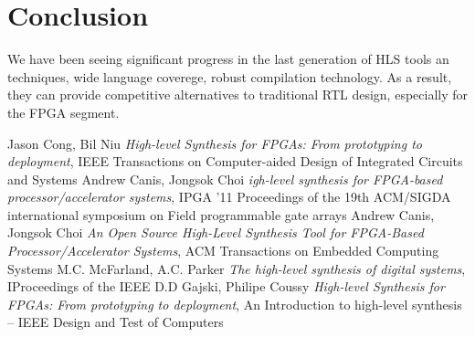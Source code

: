 \documentclass{romjist}
\begin{document}
\section{Conclusion}

\quad We have been seeing significant progress in the last generation of HLS tools an techniques, wide language coverege, robust compilation technology. As a result, they can provide competitive alternatives to traditional RTL design, especially  for the FPGA segment. 



 
\begin{thebibliography}{24}
	Jason Cong, Bil Niu \textit{High-level Synthesis for FPGAs: From prototyping to deployment}, IEEE Transactions on Computer-aided Design of Integrated Circuits and Systems
	Andrew Canis, Jongsok Choi \textit{igh-level synthesis for FPGA-based processor/accelerator systems}, IPGA ’11 Proceedings of the 19th ACM/SIGDA international symposium on Field programmable gate arrays
	Andrew Canis, Jongsok Choi \textit{An Open Source High-Level Synthesis Tool for FPGA-Based Processor/Accelerator Systems}, ACM Transactions on Embedded Computing Systems
 M.C. McFarland, A.C. Parker  \textit{The high-level synthesis of digital systems}, IProceedings of the IEEE
	D.D Gajski, Philipe Coussy \textit{High-level Synthesis for FPGAs: From prototyping to deployment}, An Introduction to high-level synthesis – IEEE Design and Test of Computers



\end{thebibliography}
\end{document}
